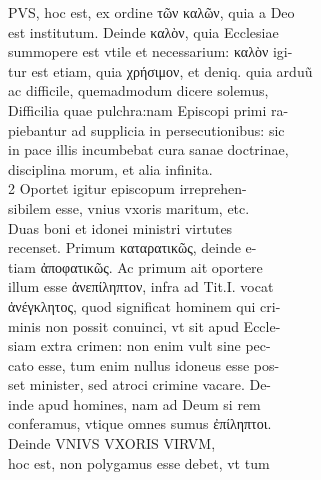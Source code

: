 \documentclass{article}
\begin{document}
\begin{pages}
                PVS, hoc est, ex ordine τῶν καλῶν, quia a Deo \\
                est institutum. Deinde καλὸν, quia Ecclesiae \\
                summopere est vtile et necessarium: καλὸν igi- \\
                tur est etiam, quia χρήσιμον, et deniq. quia arduũ \\
                ac difficile, quemadmodum dicere solemus, \\
                Difficilia quae pulchra:nam Episcopi primi ra- \\
                piebantur ad supplicia in persecutionibus: sic \\
                in pace illis incumbebat cura sanae doctrinae, \\
                disciplina morum, et alia infinita. \\
                2 Oportet igitur episcopum irreprehen- \\
                sibilem esse, vnius vxoris maritum, etc. \\
                Duas boni et idonei ministri virtutes \\
                recenset. Primum καταρατικῶς, deinde e- \\
                tiam ἀποφατικῶς. Ac primum ait oportere \\
                illum esse ἀνεπίληπτον, infra ad Tit.I. vocat \\
                ἀνέγκλητος, quod significat hominem qui cri- \\
                minis non possit conuinci, vt sit apud Eccle- \\
                siam extra crimen: non enim vult sine pec- \\
                cato esse, tum enim nullus idoneus esse pos- \\
                set minister, sed atroci crimine vacare. De- \\
                inde apud homines, nam ad Deum si rem \\
                conferamus, vtique omnes sumus ἐπίληπτοι. \\
                Deinde VNIVS VXORIS VIRVM, \\
                hoc est, non polygamus esse debet, vt tum \\

\end{pages}
\end{document}
